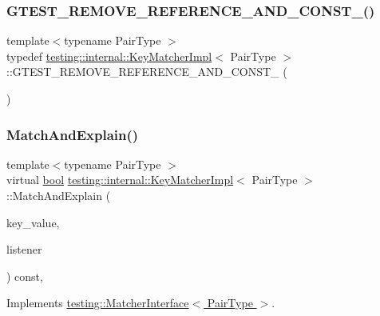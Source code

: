 \subsubsection{\texorpdfstring{G\+T\+E\+S\+T\+\_\+\+R\+E\+M\+O\+V\+E\+\_\+\+R\+E\+F\+E\+R\+E\+N\+C\+E\+\_\+\+A\+N\+D\+\_\+\+C\+O\+N\+S\+T\+\_\+()}{GTEST\_REMOVE\_REFERENCE\_AND\_CONST\_()}}
{\footnotesize\ttfamily template$<$typename Pair\+Type $>$ \\
typedef \hyperlink{classtesting_1_1internal_1_1KeyMatcherImpl}{testing\+::internal\+::\+Key\+Matcher\+Impl}$<$ Pair\+Type $>$\+::G\+T\+E\+S\+T\+\_\+\+R\+E\+M\+O\+V\+E\+\_\+\+R\+E\+F\+E\+R\+E\+N\+C\+E\+\_\+\+A\+N\+D\+\_\+\+C\+O\+N\+S\+T\+\_\+ (\begin{DoxyParamCaption}\item[{Pair\+Type}]{ }\end{DoxyParamCaption})}

\mbox{\label{classtesting_1_1internal_1_1KeyMatcherImpl_ae821c96473c6400defbb21eb9eca8d4c}} 
\subsubsection{\texorpdfstring{Match\+And\+Explain()}{MatchAndExplain()}}
{\footnotesize\ttfamily template$<$typename Pair\+Type $>$ \\
virtual \hyperlink{classbool}{bool} \hyperlink{classtesting_1_1internal_1_1KeyMatcherImpl}{testing\+::internal\+::\+Key\+Matcher\+Impl}$<$ Pair\+Type $>$\+::Match\+And\+Explain (\begin{DoxyParamCaption}\item[{Pair\+Type}]{key\+\_\+value,  }\item[{\hyperlink{classtesting_1_1MatchResultListener}{Match\+Result\+Listener} $\ast$}]{listener }\end{DoxyParamCaption}) const\hspace{0.3cm}{\ttfamily [inline]}, {\ttfamily [virtual]}}



Implements \hyperlink{classtesting_1_1MatcherInterface_a296b43607cd99d60365f0e6a762777cf}{testing\+::\+Matcher\+Interface$<$ Pair\+Type $>$}.



